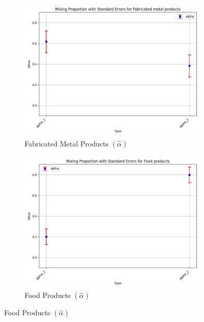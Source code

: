 \documentclass{article}
\begin{document}
\begin{figure}[ht!]
    \centering 
    \caption{I.I.D Normal Model with $\log K$, Import and CIIU}
    \begin{subfigure}[t]{0.32\textwidth}
        \centering
        \includegraphics[width=\textwidth]{figure/empirical_stat_normal_kmshare_ciiu_alpha_with_error_bars_Fabricated metal products.png}
        \caption{Fabricated Metal Products $(\hat\alpha)$}
    \end{subfigure}
    \begin{subfigure}[t]{0.32\textwidth}
        \centering
        \includegraphics[width=\textwidth]{figure/empirical_stat_normal_kmshare_ciiu_alpha_with_error_bars_Food products.png}
        \caption{Food Products  $(\hat\alpha)$}

\end{subfigure}
\end{figure}
\end{document}
